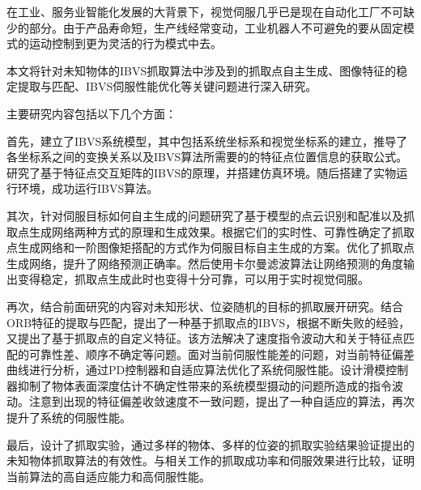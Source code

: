 \begin{cabstract}
在工业、服务业智能化发展的大背景下，视觉伺服几乎已是现在自动化工厂不可缺少的部分。由于产品寿命短，生产线经常变动，工业机器人不可避免的要从固定模式的运动控制到更为灵活的行为模式中去。


本文将针对未知物体的IBVS抓取算法中涉及到的抓取点自主生成、图像特征的稳定提取与匹配、IBVS伺服性能优化等关键问题进行深入研究。


主要研究内容包括以下几个方面：


首先，建立了IBVS系统模型，其中包括系统坐标系和视觉坐标系的建立，推导了各坐标系之间的变换关系以及IBVS算法所需要的的特征点位置信息的获取公式。研究了基于特征点交互矩阵的IBVS的原理，并搭建仿真环境。随后搭建了实物运行环境，成功运行IBVS算法。


其次，针对伺服目标如何自主生成的问题研究了基于模型的点云识别和配准以及抓取点生成网络两种方式的原理和生成效果。根据它们的实时性、可靠性确定了抓取点生成网络和一阶图像矩搭配的方式作为伺服目标自主生成的方案。优化了抓取点生成网络，提升了网络预测正确率。然后使用卡尔曼滤波算法让网络预测的角度输出变得稳定，抓取点生成此时也变得十分可靠，可以用于实时视觉伺服。


再次，结合前面研究的内容对未知形状、位姿随机的目标的抓取展开研究。结合ORB特征的提取与匹配，提出了一种基于抓取点的IBVS，根据不断失败的经验，又提出了基于抓取点的自定义特征。该方法解决了速度指令波动大和关于特征点匹配的可靠性差、顺序不确定等问题。面对当前伺服性能差的问题，对当前特征偏差曲线进行分析，通过PD控制器和自适应算法优化了系统伺服性能。设计滑模控制器抑制了物体表面深度估计不确定性带来的系统模型摄动的问题所造成的指令波动。注意到出现的特征偏差收敛速度不一致问题，提出了一种自适应的算法，再次提升了系统的伺服性能。


最后，设计了抓取实验，通过多样的物体、多样的位姿的抓取实验结果验证提出的未知物体抓取算法的有效性。与相关工作的抓取成功率和伺服效果进行比较，证明当前算法的高自适应能力和高伺服性能。


\end{cabstract}

